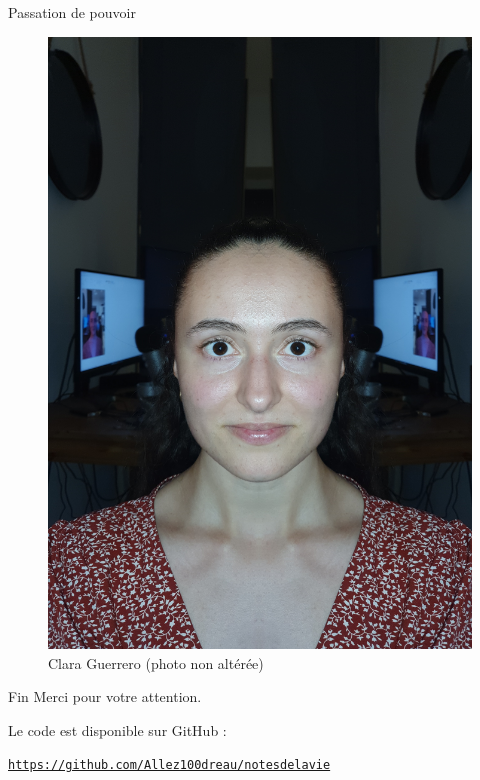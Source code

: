 \documentclass[svgnames]{beamer}
\begin{document}
\begin{frame}{Passation de pouvoir}

\begin{figure}
    \centering
    \includegraphics[scale=0.05]{data/carla.jpg}
    \caption{Clara Guerrero (photo non altérée)}
    \label{fig:my_label}
\end{figure}
    
\end{frame}

\begin{frame}{Fin}
    Merci pour votre attention.  \newline

    Le code est disponible sur GitHub : \newline

    \centering
    \href{https://github.com/Allez100dreau/notesdelavie}{\texttt{https://github.com/Allez100dreau/notesdelavie}}
\end{frame}
\end{document}
